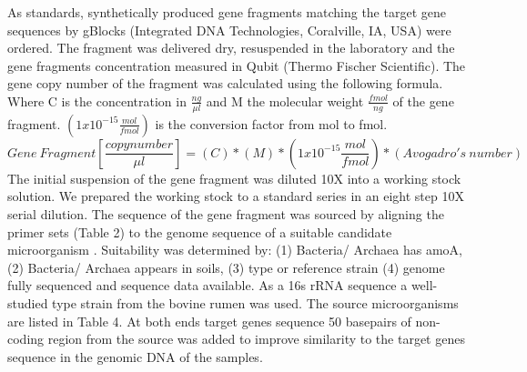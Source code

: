 \documentclass[twoside,12pt,final]{ucthesis-CA2012}
\begin{document}
\begin{ucmainmatter}
As standards, synthetically produced gene fragments matching the target gene sequences by gBlocks (Integrated DNA Technologies, Coralville, IA, USA) were
ordered. The fragment was delivered dry, resuspended in the laboratory and the gene fragments concentration measured in Qubit (Thermo Fischer Scientific). The
gene copy number of the fragment was calculated using the following formula. Where C is the concentration in \(\frac{ng}{\mu l}\) and M the molecular weight \(\frac{fmol}{ng}\) of the gene fragment. \((1 x 10^{-15}\frac{mol}{fmol})\) is the conversion factor from mol to fmol.
\begin{equation} 
Gene\:Fragment[\frac{copy number}{\mu l}]=(C)*(M)*(1 x 10^{-15}\frac{mol}{fmol})*(Avogadro's\: number)
\end{equation}
The initial suspension of the gene fragment was diluted 10X into a working stock solution. We prepared the working stock to a standard series in an eight step 10X serial dilution. The sequence of the gene fragment was sourced by aligning the primer sets (Table 2) to the genome sequence of a suitable candidate microorganism . Suitability was determined by: (1) Bacteria/ Archaea has amoA, (2) Bacteria/ Archaea appears in soils, (3) type or reference strain (4) genome fully sequenced and sequence data available. As a 16s rRNA sequence a well-studied type strain from the bovine rumen was used. The source microorganisms are listed in Table 4. At both ends target genes sequence 50 basepairs of non-coding region from the source was added to improve similarity to the target genes sequence in the genomic DNA of the samples.
\begin{table}


\end{table}
\end{ucmainmatter}
\end{document}
